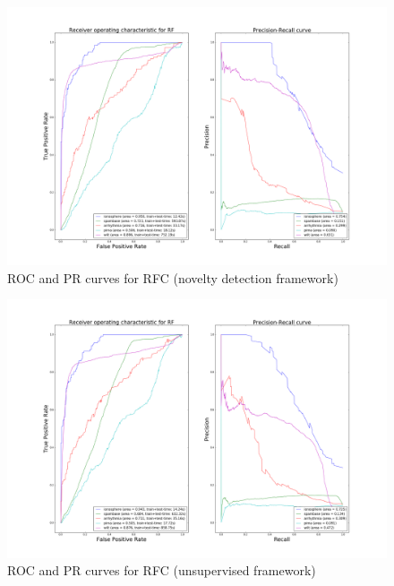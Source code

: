 \begin{figure}[!ht]
  \caption{ROC and PR curves for RFC (novelty detection framework)}
  \label{ocrf:fig:rf_roc_pr}
  \centering
  \includegraphics[trim=175 80 175 123, clip, width=\linewidth]{fig_source/ocrf_fig/bench_rf_roc_pr_supervised_factorized.png}
\end{figure}
\begin{figure}[!ht]
  \caption{ROC and PR curves for RFC (unsupervised framework)}
  \label{ocrf:fig:rf_roc_pr_unsupervised}
  \centering
  \includegraphics[trim=175 80 175 123, clip, width=\linewidth]{fig_source/ocrf_fig/bench_rf_roc_pr_unsupervised_factorized.png}
\end{figure}


